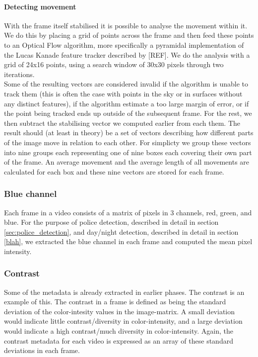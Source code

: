 \paragraph{Detecting movement}
%
With the frame itself stabilised it is possible to analyse the movement within it. We do this by placing a grid of points across the frame and then feed these points to an Optical Flow algorithm, more specifically a pyramidal implementation of the Lucas Kanade feature tracker described by [REF]. We do the analysis with a grid of 24x16 points, using a search window of 30x30 pixels through two iterations.\\%
Some of the resulting vectors are considered invalid if the algorithm is unable to track them (this is often the case with points in the sky or in surfaces without any distinct features), if the algorithm estimate a too large margin of error, or if the point being tracked ends up outside of the subsequent frame. For the rest, we then subtract the stabilising vector we computed earlier from each them. The result should (at least in theory) be a set of vectors describing how different parts of the image move in relation to each other. For simplicty we group these vectors into nine groups each representing one of nine boxes each covering their own part of the frame. An average movement and the average length of all movements are calculated for each box and these nine vectors are stored for each frame.
%
%
\subsubsection{Blue channel}\label{sec:blue_channel}
%
Each frame in a video consists of a matrix of pixels in 3 channels, red, green, and blue. For the purpose of police detection, described in detail in section \ref{sec:police_detection}, and day/night detection, described in detail in section \ref{blah}, we extracted the blue channel in each frame and computed the mean pixel intensity.
%
\subsubsection{Contrast}
%
Some of the metadata is already extracted in earlier phases. The contrast is an example of this. The contrast in a frame is defined as being the standard deviation of the color-intesity values in the image-matrix. A small deviation would indicate little contrast/diversity in color-intensity, and a large deviation would indicate a high contrast/much diversity in color-intensity. Again, the contrast metadata for each video is expressed as an array of these standard deviations in each frame.
%
